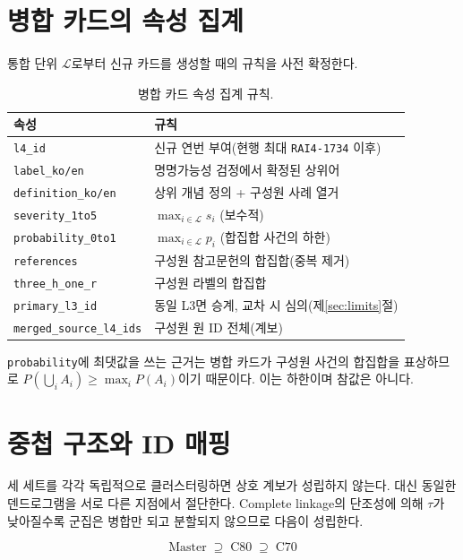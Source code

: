 \documentclass[11pt,a4paper]{article}
\newcommand{\cL}{\mathcal{L}}
\begin{document}
\section{병합 카드의 속성 집계}

통합 단위 $\cL$로부터 신규 카드를 생성할 때의 규칙을 사전 확정한다.

\begin{table}[h]
\centering
\small
\begin{tabular}{@{}ll@{}}
\toprule
속성 & 규칙 \\
\midrule
\texttt{l4\_id} & 신규 연번 부여(현행 최대 \texttt{RAI4-1734} 이후) \\
\texttt{label\_ko/en} & 명명가능성 검정에서 확정된 상위어 \\
\texttt{definition\_ko/en} & 상위 개념 정의 + 구성원 사례 열거 \\
\texttt{severity\_1to5} & $\max_{i \in \cL} s_i$ (보수적) \\
\texttt{probability\_0to1} & $\max_{i \in \cL} p_i$ (합집합 사건의 하한) \\
\texttt{references} & 구성원 참고문헌의 합집합(중복 제거) \\
\texttt{three\_h\_one\_r} & 구성원 라벨의 합집합 \\
\texttt{primary\_l3\_id} & 동일 L3면 승계, 교차 시 심의(제\ref{sec:limits}절) \\
\texttt{merged\_source\_l4\_ids} & 구성원 원 ID 전체(계보) \\
\bottomrule
\end{tabular}
\caption{병합 카드 속성 집계 규칙.}
\end{table}

\texttt{probability}에 최댓값을 쓰는 근거는 병합 카드가 구성원 사건의 합집합을 표상하므로 $P(\bigcup_i A_i) \geq \max_i P(A_i)$이기 때문이다. 이는 하한이며 참값은 아니다.

\section{중첩 구조와 ID 매핑}

세 세트를 각각 독립적으로 클러스터링하면 상호 계보가 성립하지 않는다. 대신 동일한 덴드로그램을 서로 다른 지점에서 절단한다. Complete linkage의 단조성에 의해 $\tau$가 낮아질수록 군집은 병합만 되고 분할되지 않으므로 다음이 성립한다.

\begin{equation}
\text{Master} \;\supseteq\; \text{C80} \;\supseteq\; \text{C70}
\end{equation}
\end{document}
